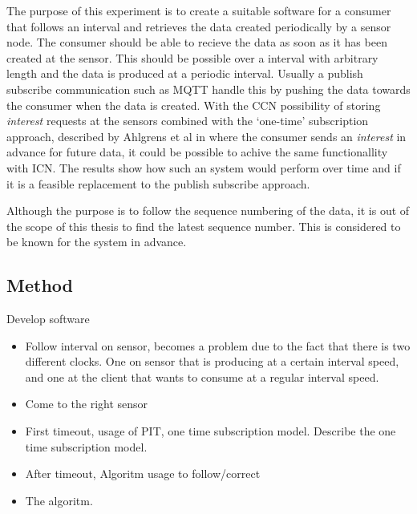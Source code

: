The purpose of this experiment is to create a suitable software for a consumer that follows an interval and retrieves the data created periodically by a sensor node. The consumer should be able to recieve the data as soon as it has been created at the sensor. This should be possible over a interval with arbitrary length and the data is produced at a periodic interval. Usually a publish subscribe communication such as MQTT handle this by pushing the data towards the consumer when the data is created. 
With the CCN possibility of storing \textit{interest} requests at the sensors combined with the `one-time' subscription approach, described by Ahlgrens et al in \cite{Ahlgreniot} where the consumer sends an \textit{interest} in advance for future data, it could be possible to achive the same functionallity with ICN. The results show how such an system would perform over time and if it is a feasible replacement to the publish subscribe approach. 

Although the purpose is to follow the sequence numbering of the data, it is out of the scope of this thesis to find the latest sequence number. This is considered to be known for the system in advance.
\subsection{Method}
Develop software

\begin{itemize}
\item Follow interval on sensor, becomes a problem due to the fact that there is two different clocks. One on sensor that is producing at a certain interval speed, and one at the client that wants to consume at a regular interval speed.
\item Come to the right sensor
\item First timeout, usage of PIT, one time subscription model. Describe the one time subscription model.
\item After timeout, Algoritm usage to follow/correct
\item The algoritm.\\
\end{itemize}

